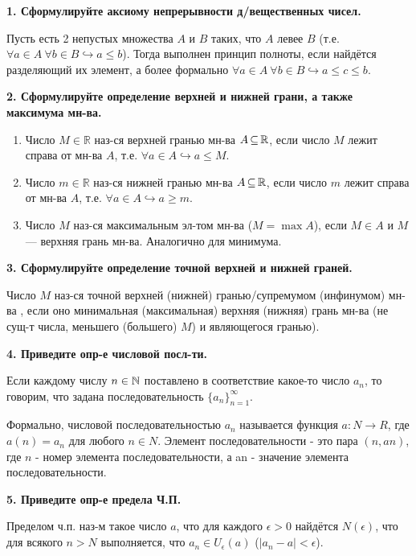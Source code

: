 


	\textbf{1. Сформулируйте аксиому непрерывности д/вещественных чисел.}
	
	Пусть есть 2 непустых множества $A$ и $B$ таких, что $A$ левее $B$ (т.е. $\forall a \in A \ \forall b \in B \hookrightarrow a \le b$). Тогда выполнен принцип полноты, если найдётся разделяющий их элемент, а более формально $\forall a \in A \ \forall b \in B \hookrightarrow a\le c \le b$.
	
	\textbf{2. Сформулируйте определение верхней и нижней грани, а также максимума мн-ва.}
	
	\begin{enumerate}
		\item Число $M \in \mathbb{R}$ наз-ся верхней гранью мн-ва $A \operatorname{\subseteq} \mathbb{R}$, если число $M$ лежит справа от мн-ва $A$, т.е. $\forall a \in A \hookrightarrow a \le M$.
		
		\item Число $m \in \mathbb{R}$ наз-ся нижней гранью мн-ва $A \operatorname{\subseteq} \mathbb{R}$, если число $m$ лежит справа от мн-ва $A$, т.е. $\forall a \in A \hookrightarrow a \ge m$.
		
		\item Число $M$ наз-ся максимальным эл-том мн-ва ($M = \max A$), если $M \in A$ и $M$ --- верхняя грань мн-ва. Аналогично для минимума.
	\end{enumerate}
	
	\textbf{3. Сформулируйте определение точной верхней и нижней граней. }
	
	Число $M$ наз-ся точной верхней (нижней) гранью/супремумом (инфинумом) мн-ва , если оно минимальная (максимальная) верхняя (нижняя) грань мн-ва (не сущ-т числа, меньшего (большего) $M$) и являющегося гранью).
	
	\textbf{4. Приведите опр-е числовой посл-ти. }
	
	Если каждому числу $n \in \mathbb{N}$ поставлено в соответствие какое-то число $a_n$, то говорим, что задана последовательность $ \textstyle\{a_n\}_{n=1}^{\infty}$.
	
	Формально, числовой последовательностью ${a_n}$ называется функция $a : N \rightarrow R$, где
	$a(n) = a_n$ для любого $n\in N$. Элемент последовательности - это пара $(n, an)$, где $n$ - номер
	элемента последовательности, а an - значение элемента последовательности.
	
	\textbf{5. Приведите опр-е предела Ч.П.}
	
	Пределом ч.п. наз-м такое число $a$, что для каждого $\epsilon > 0$ найдётся $N(\epsilon)$, что для всякого $n > N$ выполняется, что $a_n \in U_\epsilon(a)$ ($|a_n - a| < \epsilon$).
	
